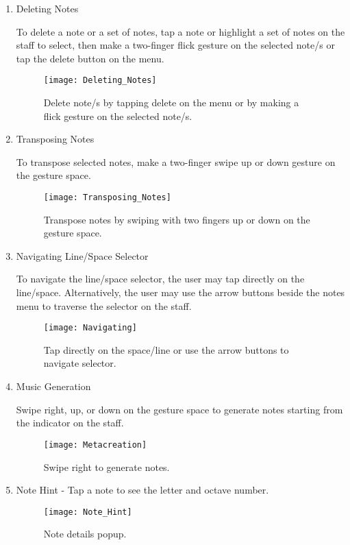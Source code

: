 \begin{enumerate}
\item Deleting Notes

To delete a note or a set of notes, tap a note or highlight a set of notes on the staff to select, then make a two-finger flick gesture on the selected note/s or tap the delete button on the menu.

\begin{figure}[H]
	\centering
	\texttt{[image: Deleting\_Notes]}
    \label{fig:delete-notes}
    \caption{Delete note/s by tapping delete on the menu or by making a flick gesture on the selected note/s.}
\end{figure}

\item Transposing Notes

To transpose selected notes, make a two-finger swipe up or down gesture on the gesture space.

\begin{figure}[H]
	\centering
	\texttt{[image: Transposing\_Notes]}
    \label{fig:transpose-notes}
    \caption{Transpose notes by swiping with two fingers up or down on the gesture space.}
\end{figure}

\item Navigating Line/Space Selector

To navigate the line/space selector, the user may tap directly on the line/space. Alternatively, the user may use the arrow buttons beside the notes menu to traverse the selector on the staff.

\begin{figure}[H]
	\centering
	\texttt{[image: Navigating]}
    \label{fig:navigating}
    \caption{Tap directly on the space/line or use the arrow buttons to navigate selector.}
\end{figure}

\item Music Generation

Swipe right, up, or down on the gesture space to generate notes starting from the indicator on the staff.

\begin{figure}[H]
	\centering
	\texttt{[image: Metacreation]}
    \label{fig:metacreation}
    \caption{Swipe right to generate notes.}
\end{figure}

\item Note Hint - Tap a note to see the letter and octave number.

\begin{figure}[H]
	\centering
	\texttt{[image: Note\_Hint]}
    \label{fig:initialselection}
    \caption{Note details popup.}
\end{figure}

\end{enumerate}

